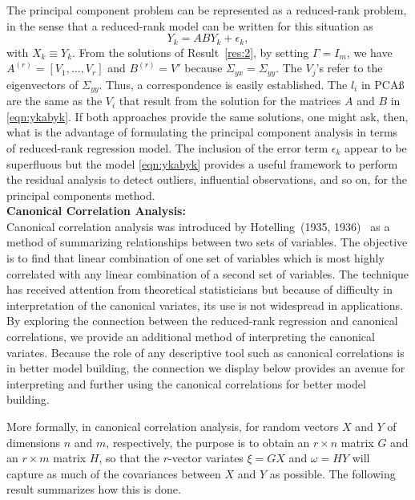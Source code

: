 The principal component problem can be represented as a reduced-rank problem, in the sense that a reduced-rank model can be written for this situation as
	\begin{equation} \label{eqn:ykabyk}
	Y_k= ABY_k + \epsilon_k,
	\end{equation}
with $X_k \equiv Y_k$. From the solutions of Result~\ref{res:2}, by setting $\Gamma= I_m$, we have $A^{(r)}= [V_1, \ldots, V_r]$ and $B^{(r)}= V'$ because $\Sigma_{yx}= \Sigma_{yy}$. The $V_j$'s refer to the eigenvectors of $\Sigma_{yy}$. Thus, a correspondence is easily established. The $l_i$ in PCAß are the same as the $V_i$ that result from the solution for the matrices $A$ and $B$ in \eqref{eqn:ykabyk}. If both approaches provide the same solutions, one might ask, then, what is the advantage of formulating the principal component analysis in terms of reduced-rank regression model. The inclusion of the error term $\epsilon_k$ appear to be superfluous but the model \eqref{eqn:ykabyk} provides a useful framework to perform the residual analysis to detect outliers, influential observations, and so on, for the principal components method. \\


\noindent \textbf{Canonical Correlation Analysis:} \\


\noindent Canonical correlation analysis was introduced by Hotelling~(1935, 1936)~\cite{hotelling35,hotelling36} as a method of summarizing relationships between two sets of variables. The objective is to find that linear combination of one set of variables which is most highly correlated with any linear combination of a second set of variables. The technique has received attention from theoretical statisticians but because of difficulty in interpretation of the canonical variates, its use is not widespread in applications. By exploring the connection between the reduced-rank regression and canonical correlations, we provide an additional method of interpreting the canonical variates. Because the role of any descriptive tool such as canonical correlations is in better model building, the connection we display below provides an avenue for interpreting and further using the canonical correlations for better model building.


More formally, in canonical correlation analysis, for random vectors $X$ and $Y$ of dimensions $n$ and $m$, respectively, the purpose is to obtain an $r \times n$ matrix $G$ and an $r \times m$ matrix $H$, so that the $r$-vector variates $\xi= GX$ and $\omega= HY$ will capture as much of the covariances between $X$ and $Y$ as possible. The following result summarizes how this is done.


